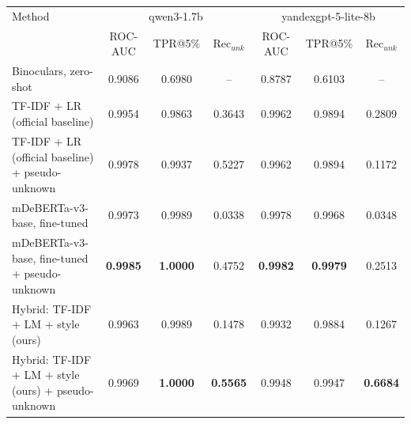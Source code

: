 \begin{tabular}{|l|ccc|ccc|}
\hline
Method & \multicolumn{3}{c|}{qwen3-1.7b} & \multicolumn{3}{c|}{yandexgpt-5-lite-8b} \\
 & ROC-AUC & TPR@5\% & Rec$_{unk}$ & ROC-AUC & TPR@5\% & Rec$_{unk}$ \\
\hline
Binoculars, zero-shot & 0.9086 & 0.6980 & -- & 0.8787 & 0.6103 & -- \\
TF-IDF + LR (official baseline) & 0.9954 & 0.9863 & 0.3643 & 0.9962 & 0.9894 & 0.2809 \\
TF-IDF + LR (official baseline) + pseudo-unknown & 0.9978 & 0.9937 & 0.5227 & 0.9962 & 0.9894 & 0.1172 \\
mDeBERTa-v3-base, fine-tuned & 0.9973 & 0.9989 & 0.0338 & 0.9978 & 0.9968 & 0.0348 \\
mDeBERTa-v3-base, fine-tuned + pseudo-unknown & \textbf{0.9985} & \textbf{1.0000} & 0.4752 & \textbf{0.9982} & \textbf{0.9979} & 0.2513 \\
Hybrid: TF-IDF + LM + style (ours) & 0.9963 & 0.9989 & 0.1478 & 0.9932 & 0.9884 & 0.1267 \\
Hybrid: TF-IDF + LM + style (ours) + pseudo-unknown & 0.9969 & \textbf{1.0000} & \textbf{0.5565} & 0.9948 & 0.9947 & \textbf{0.6684} \\
\hline
\end{tabular}
